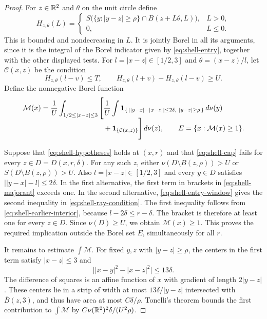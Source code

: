 \begin{proof}
For $z\in\mathbb R^2$ and $\theta$ on the unit circle define
\[
H_{z,\theta}(L)=
 \begin{cases}
 S\bigl(\{y:|y-z|\ge\rho\}\cap B(z+L\theta,L)\bigr),&L>0,\\
 0,&L\le0.
 \end{cases}
\]
This is bounded and nondecreasing in $L$. It is jointly Borel in all
its arguments, since it is the integral of the Borel indicator given
by \eqref{eq:shell-entry}, together with the other displayed tests.
For $l=|x-z|\in[1/2,3]$ and $\theta=(x-z)/l$, let $\mathcal C(x,z)$
be the condition
\begin{equation}\label{eq:shell-ray-condition}
H_{z,\theta}(l-v)\le T,
\qquad H_{z,\theta}(l+v)-H_{z,\theta}(l-v)\ge U.
\end{equation}
Define the nonnegative Borel function
\begin{align}
\mathcal M(x)=\frac1U\int_{1/2\le|x-z|\le3}
 \Bigg[&\frac1U\int
 \mathbf1_{\{\,\left||y-x|-|x-z|\right|\le2\delta,
                         \ |y-z|\ge\rho\,\}}\,d\nu(y)
 \notag\\[-2mm]
 &+\mathbf1_{\{\mathcal C(x,z)\}}\Bigg]\,d\nu(z),
 \qquad E=\{x:\mathcal M(x)\ge1\}.
 \label{eq:shell-majorant}
\end{align}

Suppose that \eqref{eq:shell-hypotheses} holds at $(x,r)$ and that
\eqref{eq:shell-cap} fails for every $z\in D=D(x,r,\delta)$.
For any such $z$, either
$\nu(D\setminus B(z,\rho))>U$ or
$S(D\setminus B(z,\rho))>U$.
Also $l=|x-z|\in[1/2,3]$ and every $y\in D$ satisfies
$\bigl||y-x|-l\bigr|\le2\delta$. In the first alternative, the
first term in brackets in \eqref{eq:shell-majorant} exceeds one.
In the second alternative, \eqref{eq:shell-entry-window} gives the
second inequality in \eqref{eq:shell-ray-condition}. The first
inequality follows from \eqref{eq:shell-earlier-interior}, because
$l-2\delta\le r-\delta$. The bracket is therefore at least one for
every $z\in D$. Since $\nu(D)\ge U$, we obtain
$\mathcal M(x)\ge1$. This proves the required implication outside
the Borel set $E$, simultaneously for all $r$.

It remains to estimate $\int\mathcal M$. For fixed $y,z$ with
$|y-z|\ge\rho$, the centers in the first term satisfy $|x-z|\le3$
and
\[
\bigl||x-y|^2-|x-z|^2\bigr|\le13\delta.
\]
The difference of squares is an affine function of $x$ with gradient
of length $2|y-z|$. These centers lie in a strip of width at most
$13\delta/|y-z|$ intersected with $\overline B(z,3)$, and thus have area at
most $C\delta/\rho$. Tonelli's theorem bounds the first contribution
to $\int\mathcal M$ by
$C\nu(\mathbb R^2)^2\delta/(U^2\rho)$.


\end{proof}
